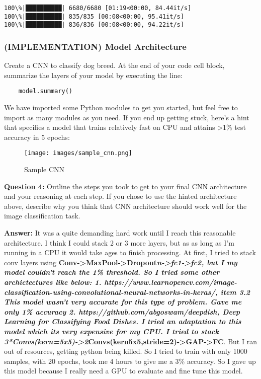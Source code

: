 \documentclass[11pt]{article}
\makeatletter
\def\maxwidth{\ifdim\Gin@nat@width>\linewidth\linewidth
    \else\Gin@nat@width\fi}
\let\Oldincludegraphics\includegraphics
\renewcommand{\includegraphics}[1]{\Oldincludegraphics[width=.8\maxwidth]{#1}}
\makeatother
\begin{document}
    \begin{Verbatim}[commandchars=\\\{\}]
100\%|██████████| 6680/6680 [01:19<00:00, 84.44it/s]
100\%|██████████| 835/835 [00:08<00:00, 95.41it/s] 
100\%|██████████| 836/836 [00:08<00:00, 94.22it/s] 

    \end{Verbatim}

    \hypertarget{implementation-model-architecture}{%
\subsubsection{(IMPLEMENTATION) Model
Architecture}\label{implementation-model-architecture}}

Create a CNN to classify dog breed. At the end of your code cell block,
summarize the layers of your model by executing the line:

\begin{verbatim}
    model.summary()
\end{verbatim}

We have imported some Python modules to get you started, but feel free
to import as many modules as you need. If you end up getting stuck,
here's a hint that specifies a model that trains relatively fast on CPU
and attains \textgreater{}1\% test accuracy in 5 epochs:

\begin{figure}
\centering
\texttt{[image: images/sample\_cnn.png]}
\caption{Sample CNN}
\end{figure}

\textbf{Question 4:} Outline the steps you took to get to your final CNN
architecture and your reasoning at each step. If you chose to use the
hinted architecture above, describe why you think that CNN architecture
should work well for the image classification task.

\textbf{Answer:} It was a quite demanding hard work until I reach this
reasonable architecture. I think I could stack 2 or 3 more layers, but
as as long as I'm running in a CPU it would take ages to finish
processing. At first, I tried to stack conv layers using
\textbf{Conv-\textgreater{}MaxPool-\textgreater{}Dropout\emph{n-\textgreater{}fc1-\textgreater{}fc2\textbf{,
but I my model couldn't reach the 1\% threshold. So I tried some other
archictectures like below: 1.
https://www.learnopencv.com/image-classification-using-convolutional-neural-networks-in-keras/,
item 3.2 This model wasn't very accurate for this type of problem. Gave
me only 1\% accuracy 2. https://github.com/abgoswam/deepdish, Deep
Learning for Classifying Food Dishes. I tried an adaptation to this
model which its very expensive for my CPU. I tried to stack
}3*Convs(kern=5x5)-\textgreater{}2}Convs(kern5x5,stride=2)-\textgreater{}GAP-\textgreater{}FC}.
But I ran out of resources, getting python being killed. So I tried to
train with only 1000 samples, with 20 epochs, took me 4 hours to give me
a 3\% accuracy. So I gave up this model because I really need a GPU to
evaluate and fine tune this model.
\end{document}
